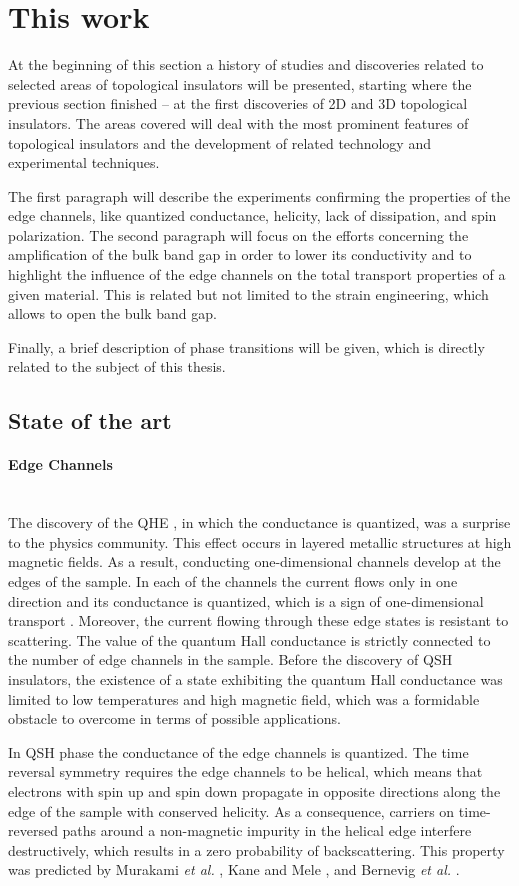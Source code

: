 \documentclass[titlepage,a4paper]{book}
\newcommand{\wciecie}{\quad\phantom{v}}
\newcommand{\myparagraph}[1]{\paragraph{#1}\mbox{}\\}
\begin{document}
\section{This work}
\wciecie
At the beginning of this section a history of studies and discoveries related to selected areas of topological insulators will be presented, starting where the previous section finished -- at the first discoveries of 2D and 3D topological insulators. The areas covered will deal with the most prominent features of topological insulators and the development of related technology and experimental techniques. 

The first paragraph will describe the experiments confirming the properties of the edge channels, like quantized conductance, helicity, lack of dissipation, and spin polarization. The second paragraph will focus on the efforts concerning the amplification of the bulk band gap in order to lower its conductivity and to highlight the influence of the edge channels on the total transport properties of a given material. This is related but not limited to the strain engineering, which allows to open the bulk band gap.

Finally, a brief description of phase transitions will be given, which is directly related to the subject of this thesis. 

\subsection{State of the art}
\myparagraph{Edge Channels}
\wciecie
The discovery of the QHE \cite{Klitzing_Topology}, in which the conductance is quantized, was a surprise to the physics community. This effect occurs in layered metallic structures at high magnetic fields. As a result, conducting one-dimensional channels develop at the edges of the sample. In each of the channels the current flows only in one direction and its conductance is quantized, which is a sign of one-dimensional transport \cite{Halperin_State}. Moreover, the current flowing through these edge states is resistant to scattering. The value of the quantum Hall conductance is strictly connected to the number of edge channels in the sample. Before the discovery of QSH insulators, the existence of a state exhibiting the quantum Hall conductance was limited to low temperatures and high magnetic field, which was a formidable obstacle to overcome in terms of possible applications.
   
In QSH phase the conductance of the edge channels is quantized. The time reversal symmetry requires the edge channels to be helical, which means that electrons with spin up and spin down propagate in opposite directions along the edge of the sample with conserved helicity. As a consequence, carriers on time-reversed paths around a non-magnetic impurity in the helical edge interfere destructively, which results in a zero probability of backscattering. This property was predicted by Murakami \textit{et al.} \cite{Murakami_State}, Kane and Mele \cite{Kane_Topology}, and Bernevig \textit{et al.} \cite{Bernevig_Topology1}. 
\end{document}
